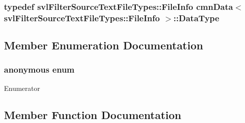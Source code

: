 \subsubsection[{Data\+Type}]{\setlength{\rightskip}{0pt plus 5cm}typedef {\bf svl\+Filter\+Source\+Text\+File\+Types\+::\+File\+Info} {\bf cmn\+Data}$<$ {\bf svl\+Filter\+Source\+Text\+File\+Types\+::\+File\+Info} $>$\+::{\bf Data\+Type}}\label{classcmn_data_3_01svl_filter_source_text_file_types_1_1_file_info_01_4_a80103f0f921c89187ac2cadd6fd22d7b}


\subsection{Member Enumeration Documentation}
\hypertarget{classcmn_data_3_01svl_filter_source_text_file_types_1_1_file_info_01_4_ac2667a1a418e7039c6152d3106926eab}{}\subsubsection[{anonymous enum}]{\setlength{\rightskip}{0pt plus 5cm}anonymous enum}\label{classcmn_data_3_01svl_filter_source_text_file_types_1_1_file_info_01_4_ac2667a1a418e7039c6152d3106926eab}
\begin{Desc}
\item[Enumerator]\par
\begin{description}
\item[{\em 
\hypertarget{classcmn_data_3_01svl_filter_source_text_file_types_1_1_file_info_01_4_ac2667a1a418e7039c6152d3106926eabaa76bfad2562771d868ca2393ab1d17af}{}I\+S\+\_\+\+S\+P\+E\+C\+I\+A\+L\+I\+Z\+E\+D\label{classcmn_data_3_01svl_filter_source_text_file_types_1_1_file_info_01_4_ac2667a1a418e7039c6152d3106926eabaa76bfad2562771d868ca2393ab1d17af}
}]\end{description}
\end{Desc}


\subsection{Member Function Documentation}
\hypertarget{classcmn_data_3_01svl_filter_source_text_file_types_1_1_file_info_01_4_a2474661be7586898c39ef2eb11a6617e}{}
